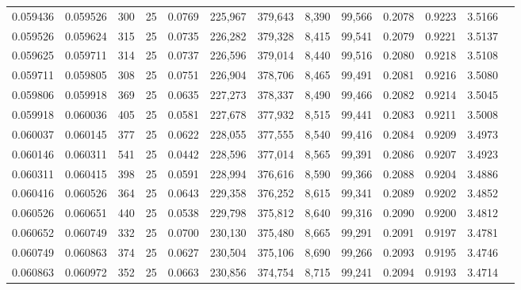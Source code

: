 \begin{tabular}{rrrrrrrrrrrrr}
0.059436 & 0.059526 &   300 &  25 &                                     0.0769 & 225,967 & 379,643 &   8,390 &  99,566 & 0.2078 & 0.9223 & 3.5166 \\
0.059526 & 0.059624 &   315 &  25 &                                     0.0735 & 226,282 & 379,328 &   8,415 &  99,541 & 0.2079 & 0.9221 & 3.5137 \\
0.059625 & 0.059711 &   314 &  25 &                                     0.0737 & 226,596 & 379,014 &   8,440 &  99,516 & 0.2080 & 0.9218 & 3.5108 \\
0.059711 & 0.059805 &   308 &  25 &                                     0.0751 & 226,904 & 378,706 &   8,465 &  99,491 & 0.2081 & 0.9216 & 3.5080 \\
0.059806 & 0.059918 &   369 &  25 &                                     0.0635 & 227,273 & 378,337 &   8,490 &  99,466 & 0.2082 & 0.9214 & 3.5045 \\
0.059918 & 0.060036 &   405 &  25 &                                     0.0581 & 227,678 & 377,932 &   8,515 &  99,441 & 0.2083 & 0.9211 & 3.5008 \\
0.060037 & 0.060145 &   377 &  25 &                                     0.0622 & 228,055 & 377,555 &   8,540 &  99,416 & 0.2084 & 0.9209 & 3.4973 \\
0.060146 & 0.060311 &   541 &  25 &                                     0.0442 & 228,596 & 377,014 &   8,565 &  99,391 & 0.2086 & 0.9207 & 3.4923 \\
0.060311 & 0.060415 &   398 &  25 &                                     0.0591 & 228,994 & 376,616 &   8,590 &  99,366 & 0.2088 & 0.9204 & 3.4886 \\
0.060416 & 0.060526 &   364 &  25 &                                     0.0643 & 229,358 & 376,252 &   8,615 &  99,341 & 0.2089 & 0.9202 & 3.4852 \\
0.060526 & 0.060651 &   440 &  25 &                                     0.0538 & 229,798 & 375,812 &   8,640 &  99,316 & 0.2090 & 0.9200 & 3.4812 \\
0.060652 & 0.060749 &   332 &  25 &                                     0.0700 & 230,130 & 375,480 &   8,665 &  99,291 & 0.2091 & 0.9197 & 3.4781 \\
0.060749 & 0.060863 &   374 &  25 &                                     0.0627 & 230,504 & 375,106 &   8,690 &  99,266 & 0.2093 & 0.9195 & 3.4746 \\
0.060863 & 0.060972 &   352 &  25 &                                     0.0663 & 230,856 & 374,754 &   8,715 &  99,241 & 0.2094 & 0.9193 & 3.4714 \\

\end{tabular}
